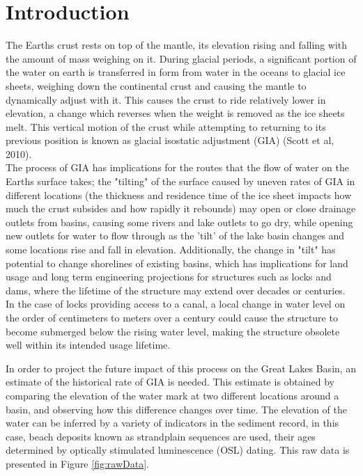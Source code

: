 \documentclass{article}
\begin{document}


\tableofcontents
\newpage


\newpage

\section{Introduction}
 The Earths crust rests on top of the mantle, its elevation rising and falling
 with the amount of mass weighing on it. During glacial periods, a significant portion
 of the water on earth is transferred in form from water in the oceans to glacial ice sheets,
 weighing down the continental crust and causing the mantle to dynamically adjust
 with it. This causes the crust to ride relatively lower in elevation,
 a change which reverses when the weight is removed as the ice sheets melt.
 This vertical motion of the crust while attempting to returning to its previous position is known
 as glacial isostatic adjustment (GIA) (Scott et al, 2010).\\
 
 The process of GIA has implications for the routes that the flow
 of water on the Earths surface takes; the "tilting" of the surface caused by 
 uneven rates of GIA in different locations (the thickness and residence time of
 the ice sheet impacts how much the crust subsides and how rapidly it rebounds) 
 may open or close drainage outlets from basins,
 causing some rivers and lake outlets to go dry, while opening new outlets for 
 water to flow through as the 'tilt' of the lake basin changes and some locations
 rise and fall in elevation.
 Additionally, the change in "tilt" has potential to change shorelines of existing
 basins,  which has implications for land usage and long term engineering
 projections for structures such as locks and dams, where the lifetime of
 the structure may extend over decades or centuries. In the case of locks providing
 access to a canal, a local change in water level on the order of centimeters to
 meters over a century could cause the structure to become submerged below the
 rising water level, making the structure obsolete well within its intended usage
 lifetime.\\

\newpage

 
 In order to project the future impact of this process on the Great Lakes Basin,
 an estimate of the historical rate of GIA is needed. This estimate is obtained by
 comparing the elevation of the water mark at two different locations around a basin, and
 observing how this difference changes over time. The elevation of the water can be inferred
 by a variety of indicators in the sediment record, in this case, beach deposits known
 as strandplain sequences are used, their ages determined by optically stimulated
 luminescence (OSL) dating. This raw data is presented in Figure \ref{fig:rawData}.\\

\end{document}
